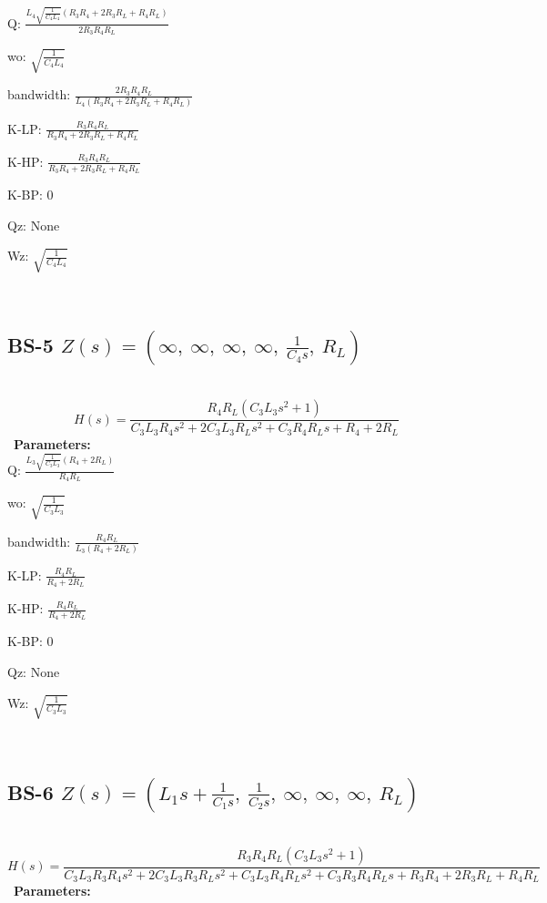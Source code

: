 \documentclass{article}
\begin{document}
Q: $\frac{L_{4} \sqrt{\frac{1}{C_{4} L_{4}}} \left(R_{3} R_{4} + 2 R_{3} R_{L} + R_{4} R_{L}\right)}{2 R_{3} R_{4} R_{L}}$\ 

wo: $\sqrt{\frac{1}{C_{4} L_{4}}}$\ 

bandwidth: $\frac{2 R_{3} R_{4} R_{L}}{L_{4} \left(R_{3} R_{4} + 2 R_{3} R_{L} + R_{4} R_{L}\right)}$\ 

K-LP: $\frac{R_{3} R_{4} R_{L}}{R_{3} R_{4} + 2 R_{3} R_{L} + R_{4} R_{L}}$\ 

K-HP: $\frac{R_{3} R_{4} R_{L}}{R_{3} R_{4} + 2 R_{3} R_{L} + R_{4} R_{L}}$\ 

K-BP: $0$\ 

Qz: $\text{None}$\ 

Wz: $\sqrt{\frac{1}{C_{4} L_{4}}}$\ 

\ 

\subsection{BS-5 $Z(s) = \left( \infty, \  \infty, \  \infty, \  \infty, \  \frac{1}{C_{4} s}, \  R_{L}\right)$ } \ 
\textbf{\[H(s) = \frac{R_{4} R_{L} \left(C_{3} L_{3} s^{2} + 1\right)}{C_{3} L_{3} R_{4} s^{2} + 2 C_{3} L_{3} R_{L} s^{2} + C_{3} R_{4} R_{L} s + R_{4} + 2 R_{L}}\] } \ 
\textbf{Parameters:}\\ 

Q: $\frac{L_{3} \sqrt{\frac{1}{C_{3} L_{3}}} \left(R_{4} + 2 R_{L}\right)}{R_{4} R_{L}}$\ 

wo: $\sqrt{\frac{1}{C_{3} L_{3}}}$\ 

bandwidth: $\frac{R_{4} R_{L}}{L_{3} \left(R_{4} + 2 R_{L}\right)}$\ 

K-LP: $\frac{R_{4} R_{L}}{R_{4} + 2 R_{L}}$\ 

K-HP: $\frac{R_{4} R_{L}}{R_{4} + 2 R_{L}}$\ 

K-BP: $0$\ 

Qz: $\text{None}$\ 

Wz: $\sqrt{\frac{1}{C_{3} L_{3}}}$\ 

\ 

\subsection{BS-6 $Z(s) = \left( L_{1} s + \frac{1}{C_{1} s}, \  \frac{1}{C_{2} s}, \  \infty, \  \infty, \  \infty, \  R_{L}\right)$ } \ 
\textbf{\[H(s) = \frac{R_{3} R_{4} R_{L} \left(C_{3} L_{3} s^{2} + 1\right)}{C_{3} L_{3} R_{3} R_{4} s^{2} + 2 C_{3} L_{3} R_{3} R_{L} s^{2} + C_{3} L_{3} R_{4} R_{L} s^{2} + C_{3} R_{3} R_{4} R_{L} s + R_{3} R_{4} + 2 R_{3} R_{L} + R_{4} R_{L}}\] } \ 
\textbf{Parameters:}\\ 
\end{document}
